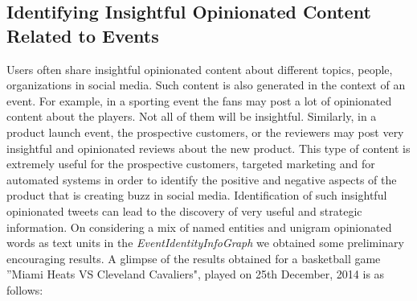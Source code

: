 \subsection{Identifying Insightful Opinionated Content Related to Events}
Users often share insightful opinionated content about different topics, people, organizations in social media. Such content is also generated in the context of an event. For example, in a sporting event the fans may post a lot of opinionated content about the players. Not all of them will be insightful. Similarly, in a product launch event, the prospective customers, or the reviewers may post very insightful and opinionated reviews about the new product. This type of content is extremely useful for the prospective customers, targeted marketing and for automated systems in order to identify the positive and negative aspects of the product that is creating buzz in social media. Identification of such insightful opinionated tweets can lead to the discovery of very useful and strategic information. On considering a mix of named entities and unigram opinionated words as text units in the \textit{EventIdentityInfoGraph} we obtained some preliminary encouraging results. A glimpse of the results obtained for a basketball game ''Miami Heats VS Cleveland Cavaliers", played on 25th December, 2014 is as follows:

